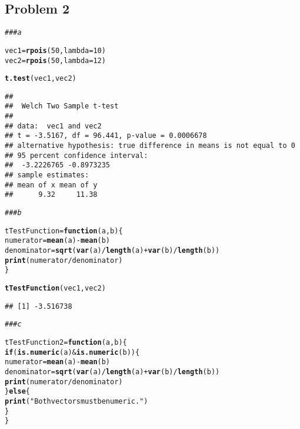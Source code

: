 \documentclass[12pt,letter]{article}\usepackage[]{graphicx}\usepackage[]{color}
\makeatletter
\newcommand{\hlnum}[1]{\textcolor[rgb]{0.686,0.059,0.569}{#1}}%
\newcommand{\hlstr}[1]{\textcolor[rgb]{0.192,0.494,0.8}{#1}}%
\newcommand{\hlcom}[1]{\textcolor[rgb]{0.678,0.584,0.686}{\textit{#1}}}%
\newcommand{\hlopt}[1]{\textcolor[rgb]{0,0,0}{#1}}%
\newcommand{\hlstd}[1]{\textcolor[rgb]{0.345,0.345,0.345}{#1}}%
\newcommand{\hlkwa}[1]{\textcolor[rgb]{0.161,0.373,0.58}{\textbf{#1}}}%
\newcommand{\hlkwb}[1]{\textcolor[rgb]{0.69,0.353,0.396}{#1}}%
\newcommand{\hlkwc}[1]{\textcolor[rgb]{0.333,0.667,0.333}{#1}}%
\newcommand{\hlkwd}[1]{\textcolor[rgb]{0.737,0.353,0.396}{\textbf{#1}}}%
\newenvironment{kframe}{%
 \def\at@end@of@kframe{}%
 \ifinner\ifhmode%
  \def\at@end@of@kframe{\end{minipage}}%
  \begin{minipage}{\columnwidth}%
 \fi\fi%
 \def\FrameCommand##1{\hskip\@totalleftmargin \hskip-\fboxsep
 \colorbox{shadecolor}{##1}\hskip-\fboxsep
     \hskip-\linewidth \hskip-\@totalleftmargin \hskip\columnwidth}%
 \MakeFramed {\advance\hsize-\width
   \@totalleftmargin\z@ \linewidth\hsize
   \@setminipage}}%
 {\par\unskip\endMakeFramed%
 \at@end@of@kframe}
\newenvironment{knitrout}{}{} %
\makeatother
\begin{document}
\subsection*{Problem 2}

\begin{knitrout}
\color{fgcolor}\begin{kframe}
\begin{alltt}
\hlcom{### a}

\hlstd{vec1} \hlkwb{=} \hlkwd{rpois}\hlstd{(}\hlnum{50}\hlstd{,} \hlkwc{lambda} \hlstd{=} \hlnum{10}\hlstd{)}
\hlstd{vec2} \hlkwb{=} \hlkwd{rpois}\hlstd{(}\hlnum{50}\hlstd{,} \hlkwc{lambda} \hlstd{=} \hlnum{12}\hlstd{)}

\hlkwd{t.test}\hlstd{(vec1, vec2)}
\end{alltt}
\begin{verbatim}
## 
## 	Welch Two Sample t-test
## 
## data:  vec1 and vec2
## t = -3.5167, df = 96.441, p-value = 0.0006678
## alternative hypothesis: true difference in means is not equal to 0
## 95 percent confidence interval:
##  -3.2226765 -0.8973235
## sample estimates:
## mean of x mean of y 
##      9.32     11.38
\end{verbatim}
\begin{alltt}
\hlcom{### b}

\hlstd{tTestFunction} \hlkwb{=} \hlkwa{function}\hlstd{(}\hlkwc{a}\hlstd{,} \hlkwc{b}\hlstd{) \{}
    \hlstd{numerator} \hlkwb{=} \hlkwd{mean}\hlstd{(a)} \hlopt{-} \hlkwd{mean}\hlstd{(b)}
    \hlstd{denominator} \hlkwb{=} \hlkwd{sqrt}\hlstd{(}\hlkwd{var}\hlstd{(a)}\hlopt{/}\hlkwd{length}\hlstd{(a)} \hlopt{+} \hlkwd{var}\hlstd{(b)}\hlopt{/}\hlkwd{length}\hlstd{(b))}
    \hlkwd{print}\hlstd{(numerator}\hlopt{/}\hlstd{denominator)}
\hlstd{\}}

\hlkwd{tTestFunction}\hlstd{(vec1, vec2)}
\end{alltt}
\begin{verbatim}
## [1] -3.516738
\end{verbatim}
\begin{alltt}
\hlcom{### c}

\hlstd{tTestFunction2} \hlkwb{=} \hlkwa{function}\hlstd{(}\hlkwc{a}\hlstd{,} \hlkwc{b}\hlstd{) \{}
    \hlkwa{if} \hlstd{(}\hlkwd{is.numeric}\hlstd{(a)} \hlopt{&} \hlkwd{is.numeric}\hlstd{(b)) \{}
        \hlstd{numerator} \hlkwb{=} \hlkwd{mean}\hlstd{(a)} \hlopt{-} \hlkwd{mean}\hlstd{(b)}
        \hlstd{denominator} \hlkwb{=} \hlkwd{sqrt}\hlstd{(}\hlkwd{var}\hlstd{(a)}\hlopt{/}\hlkwd{length}\hlstd{(a)} \hlopt{+} \hlkwd{var}\hlstd{(b)}\hlopt{/}\hlkwd{length}\hlstd{(b))}
        \hlkwd{print}\hlstd{(numerator}\hlopt{/}\hlstd{denominator)}
    \hlstd{\}} \hlkwa{else} \hlstd{\{}
        \hlkwd{print}\hlstd{(}\hlstr{"Both vectors must be numeric."}\hlstd{)}
    \hlstd{\}}
\hlstd{\}}
\end{alltt}
\end{kframe}
\end{knitrout}
\end{document}
